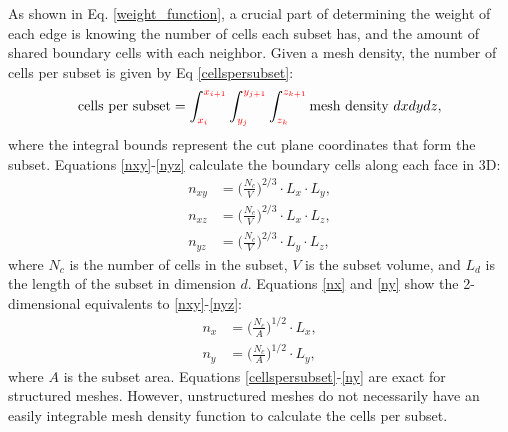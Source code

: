 As shown in Eq. \ref{weight_function}, a crucial part of determining the weight of each edge is knowing the number of cells each subset has, and the amount of shared boundary cells with each neighbor. Given a mesh density, the number of cells per subset is given by Eq \ref{cellspersubset}:
\begin{equation}
   \text{cells per subset} = \int_{\textcolor{red}{x_i}}^{\textcolor{red}{x_{i+1}}} \int_{\textcolor{red}{y_j}}^{\textcolor{red}{y_{j+1}}} \int_{\textcolor{red}{z_k}}^{\textcolor{red}{z_{k+1}}} \text{mesh density } dx dy dz,
\label{cellspersubset}
\end{equation}
where the integral bounds represent the cut plane coordinates that form the subset. 
Equations \ref{nxy}-\ref{nyz} calculate the boundary cells along each face in 3D:
\begin{align}
n_{xy} &= \Big(\frac{N_c}{V}\Big)^{2/3}\cdot L_x\cdot L_y \label{nxy}, \\
n_{xz} &= \Big(\frac{N_c}{V}\Big)^{2/3}\cdot L_x\cdot L_z \label{nxz}, \\
n_{yz} &= \Big(\frac{N_c}{V}\Big)^{2/3}\cdot L_y\cdot L_z \label{nyz},
\end{align}
where $N_c$ is the number of cells in the subset, $V$ is the subset volume, and $L_d$ is the length of the subset in dimension $d$.
Equations \ref{nx} and \ref{ny} show the 2-dimensional equivalents to \ref{nxy}-\ref{nyz}:
\begin{align}
n_x &= \Big(\frac{N_c}{A}\Big)^{1/2}\cdot L_x, \label{nx} \\
n_y &= \Big(\frac{N_c}{A}\Big)^{1/2}\cdot L_y, \label{ny}
\end{align}
where $A$ is the subset area. Equations \ref{cellspersubset}-\ref{ny} are exact for structured meshes. 
However, unstructured meshes do not necessarily have an easily integrable mesh density function to calculate the cells per subset. 

